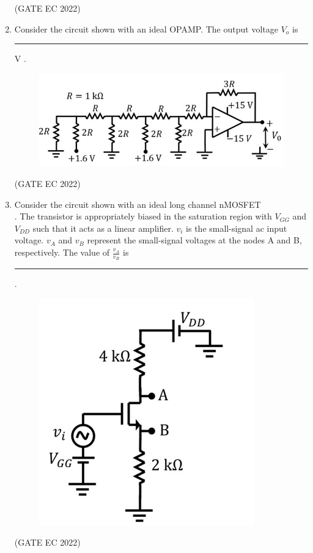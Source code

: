 \documentclass[journal,12pt,onecolumn]{IEEEtran}
\theoremstyle{remark}
\begin{document}
\begin{enumerate}
    \hfill{(GATE EC 2022)}

    \item Consider the circuit shown  with an ideal OPAMP. The output voltage $V_o$ is \rule{2cm}{0.4pt} V .
    \begin{figure}[H]
        \centering
        \includegraphics[width=0.5\columnwidth]{figs/m29.jpg}
        \caption*{}
        \label{fig:m29}
    \end{figure}
    
    \hfill{(GATE EC 2022)}

    \item Consider the circuit shown  with an ideal long channel nMOSFET \\ . The transistor is appropriately biased in the saturation region with $V_{GG}$ and $V_{DD}$ such that it acts as a linear amplifier. $v_i$ is the small-signal ac input voltage. $v_A$ and $v_B$ represent the small-signal voltages at the nodes A and B, respectively. The value of $\frac{v_A}{v_B}$ is \rule{2cm}{0.4pt} .
    \begin{figure}[H]
        \centering
        \includegraphics[width=0.4\columnwidth]{figs/m30.jpg}
        \caption*{}
        \label{fig:m30}
    \end{figure}
    
    \hfill{(GATE EC 2022)}


\end{enumerate}
\end{document}
